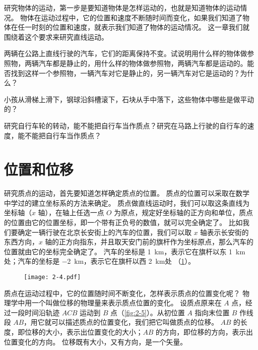 研究物体的运动，第一步是要知道物体是怎样运动的，也就是知道物体的运动情况。
物体在运动过程中，它的位置和速度不断随时间而变化，如果我们知道了物体在任一时刻的位置和速度，就表示我们知道了物体的运动情况。
这一章我们就围绕着这个要求来研究直线运动。

\begin{Practice}
\begin{question}
\item 两辆在公路上直线行驶的汽车，它们的距离保持不变。试说明用什么样的物体做参照物，两辆汽车都是静止的，用什么样的物体做参照物，两辆汽车都是运动的。能否找到这样一个参照物，一辆汽车对它是静止的，另一辆汽车对它是运动的？为什么？

\item 小孩从滑梯上滑下，钢球沿斜槽滚下，石块从手中落下，这些物体中哪些是做平动的？

\item 研究自行车轮的转动，能不能把自行车当作质点？研究在马路上行驶的自行车的速度，能不能把自行车当作质点？
\end{question}
\end{Practice}

\section{位置和位移}
研究质点的运动，首先要知道怎样确定质点的位置。
质点的位置可以采取在数学中学过的建立坐标系的方法来确定。
质点做直线运动时，我们可以取这条直线为坐标轴（$x$ 轴），在轴上任选一点 $O$ 为原点，规定好坐标轴的正方向和单位，质点的位置由它的位置坐标，即一个带有正负号的数值，就可以完全确定了。
比如我们要确定一辆行驶在北京长安街上的汽车的位置，我们可以取 $x$ 轴表示长安街的东西方向，$x$ 轴的正方向指东，并且取天安门前的旗杆作为坐标原点，那么汽车的位置就由它的坐标完全确定了。
汽车的坐标是 \qty{1}{km}，表示它在旗杆以东 \qty{1}{km} 处；汽车的坐标是 \qty{-2}{km}，表示它在旗杆以西 \qty{2}{km}处 （\cref{fig:2-4}）。
\begin{figure}
  \texttt{[image: 2-4.pdf]}
  \caption{}\label{fig:2-4}
\end{figure}

质点在运动过程中，它的位置随时间不断变化，怎样表示质点的位置变化呢？
物理学中用一个叫做位移的物理量来表示质点位置的变化。
设质点原来在 $A$ 点，经过一段时间沿轨迹 $ACB$ 运动到 $B$ 点（\cref{fig:2-5}）。从初位置 $A$ 指向末位置 $B$ 作线段 $AB$，用它就可以描述质点的位置变化，我们把它叫做质点的位移。
$AB$ 的长度，即位移的大小，表示出位置变化的大小；$AB$ 的方向，即位移的方向，表示出位置变化的方向。
位移既有大小，又有方向，是一个矢量。

